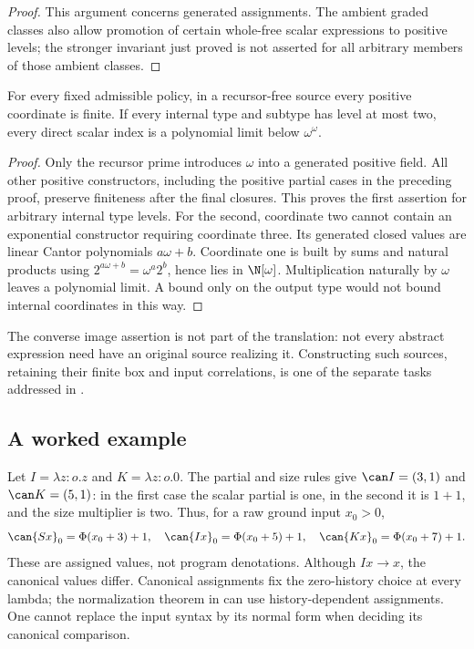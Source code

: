 \begin{proof}
This argument concerns generated assignments.  The ambient graded classes
also allow promotion of certain whole-free scalar expressions to positive
levels; the stronger invariant just proved is not asserted for all arbitrary
members of those ambient classes.
\end{proof}

\begin{corollary}\label{cor:source-classes}
For every fixed admissible policy, in a recursor-free source every positive coordinate is finite.  If every
internal type and subtype has level at most two, every direct scalar index
is a polynomial limit below $\omega^\omega$.
\end{corollary}
\begin{proof}
Only the recursor prime introduces $\omega$ into a generated positive field.
All other positive constructors, including the positive partial cases in
the preceding proof, preserve finiteness after the final closures.  This
proves the first assertion for arbitrary internal type levels.
For the second, coordinate two cannot contain an exponential constructor
requiring coordinate three.  Its generated closed values are linear Cantor
polynomials $a\omega+b$.  Coordinate one is built by sums and natural products
using $2^{a\omega+b}=\omega^a2^b$, hence lies in $\N[\omega]$.
Multiplication naturally by $\omega$ leaves a polynomial limit.  A bound
only on the output type would not bound internal coordinates in this way.
\end{proof}

The converse image assertion is not part of the translation: not every
abstract expression need have an original source realizing it.  Constructing
such sources, retaining their finite box and input correlations, is one of
the separate tasks addressed in \cite{wwexpressivity}.

\subsection{A worked example}
Let $I=\lambda z:o.z$ and $K=\lambda z:o.0$.  The partial and size rules
give $\can I=(3,1)$ and $\can K=(5,1)$: in the first case the scalar
partial is one, in the second it is $1+1$, and the size multiplier is two.
Thus, for a raw ground input $x_0>0$,
\[
 \can{Sx}_0=\Phi(x_0+3)+1,\quad
 \can{Ix}_0=\Phi(x_0+5)+1,\quad
 \can{Kx}_0=\Phi(x_0+7)+1.
\]
These are assigned values, not program denotations.  Although $Ix\to x$,
the canonical values differ.  Canonical assignments fix the zero-history
choice at every lambda; the normalization theorem in \cite{ww} can use
history-dependent assignments.  One cannot replace the input syntax by its
normal form when deciding its canonical comparison.
